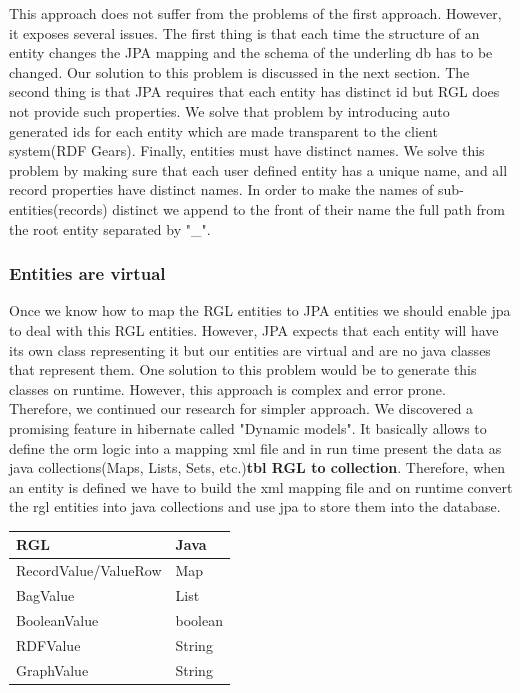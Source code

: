 \documentclass[a4paper, notitlepage]{article}
\begin{document}
This approach does not suffer from the problems of the first approach. However, it exposes several issues. The first thing is that each time the structure of an entity changes the JPA mapping and the schema of the underling db has to be changed. Our solution to this problem is discussed in the next section. The second thing is that JPA requires that each entity has distinct id but RGL does not provide such properties. We solve that problem by introducing auto generated ids for each entity which are made transparent to the client system(RDF Gears). Finally, entities must have distinct names. We solve this problem by making sure that each user defined entity has a unique name, and all record properties have distinct names. In order to make the names of sub-entities(records) distinct we append to the front of their name the full path from the root entity separated by "\_".


\subsubsection{Entities are virtual}
Once we know how to map the RGL entities to JPA entities we should enable jpa to deal with this RGL entities. However, JPA expects that each entity will have its own class representing it but our entities are virtual and are no java classes that represent them. One solution to this problem would be to generate this classes on runtime. However, this approach is complex and error prone. Therefore, we continued our research for simpler approach. We discovered a promising feature in hibernate called "Dynamic models". It basically allows to define the orm logic into a mapping xml file and in run time present the data as java collections(Maps, Lists, Sets, etc.)\textbf{tbl RGL to collection}. Therefore, when an entity is defined we have to build the xml mapping file and on runtime convert the rgl entities into java collections and use jpa to store them into the database.

\begin{center}
    \begin{tabular}{ | l | l |}
    \hline
    RGL & Java  \\ \hline
    RecordValue/ValueRow & Map  \\ \hline
    BagValue & List  \\ \hline
    BooleanValue & boolean  \\ \hline
    RDFValue & String  \\ \hline
	GraphValue & String  \\ \hline

    \end{tabular}
\end{center}
 
\end{document}
